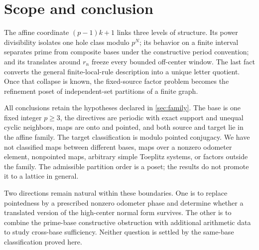 \section{Scope and conclusion}
\label{sec:conclusion}

The affine coordinate $(p-1)k+1$ links three levels of structure.  Its
power divisibility isolates one hole class modulo $p^N$; its behavior on a
finite interval separates prime from composite bases under the constructive
period convention; and its translates around $r_n$ freeze every bounded
off-center window.  The last fact converts the general finite-local-rule
description into a unique letter quotient.  Once that collapse is known,
the fixed-source factor problem becomes the refinement poset of
independent-set partitions of a finite graph.

All conclusions retain the hypotheses declared in \cref{sec:family}.  The
base is one fixed integer $p\geq3$, the directives are periodic with exact
support and unequal cyclic neighbors, maps are onto and pointed, and both
source and target lie in the affine family.  The target classification is
modulo pointed conjugacy.  We have not classified maps between different
bases, maps over a nonzero odometer element, nonpointed maps, arbitrary
simple Toeplitz systems, or factors outside the family.  The admissible
partition order is a poset; the results do not promote it to a lattice in
general.

Two directions remain natural within these boundaries.  One is to replace
pointedness by a prescribed nonzero odometer phase and determine whether a
translated version of the high-center normal form survives.  The other is
to combine the prime-base constructive obstruction with additional
arithmetic data to study cross-base sufficiency.  Neither question is
settled by the same-base classification proved here.
